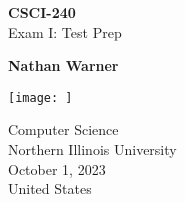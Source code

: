 \documentclass{report}
\title{\Huge{}}
\author{\huge{Nathan Warner}}
\date{\huge{}}
\begin{document}
        \begin{titlepage}
       \begin{center}
           \vspace*{1cm}
    
           \textbf{CSCI-240} \\
           Exam I: Test Prep
    
           \vspace{0.5cm}
            
                
           \vspace{1.5cm}
    
           \textbf{Nathan Warner}
    
           \vfill
                
                
           \vspace{0.8cm}
         
           \texttt{[image: ]}
                
           Computer Science \\
           Northern Illinois University\\
           October 1, 2023 \\
           United States\\
           
                
       \end{center}
    \end{titlepage}
    \tableofcontents
    \pagebreak \bigbreak \noindent
\end{document}
